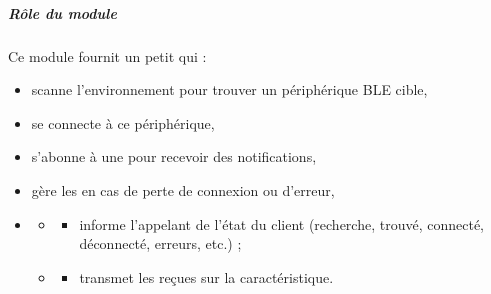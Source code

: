 \documentclass[letterpaper,10pt,french]{sphinxmanual}
\begin{document}
\subparagraph{Rôle du module}
\label{\detokenize{api/hardware.transports:role-du-module}}
\sphinxAtStartPar
Ce module fournit un petit  qui :
\begin{itemize}
\item {} 
\sphinxAtStartPar
scanne l’environnement pour trouver un périphérique BLE cible,

\item {} 
\sphinxAtStartPar
se connecte à ce périphérique,

\item {} 
\sphinxAtStartPar
s’abonne à une  pour recevoir des notifications,

\item {} 
\sphinxAtStartPar
gère les  en cas de perte de connexion
ou d’erreur,

\item {} \begin{description}
\begin{itemize}
\item {} \begin{description}
\begin{itemize}
\item {} 
\sphinxAtStartPar
informe l’appelant de l’état du client (recherche, trouvé,
connecté, déconnecté, erreurs, etc.) ;

\end{itemize}

\end{description}

\item {} \begin{description}
\begin{itemize}
\item {} 
\sphinxAtStartPar
transmet les  reçues sur la caractéristique.

\end{itemize}

\end{description}

\end{itemize}

\end{description}

\end{itemize}
\end{document}
